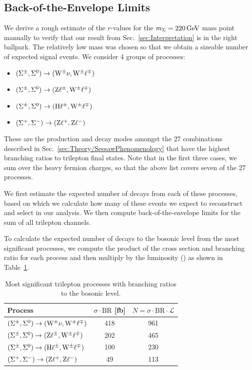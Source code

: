 \subsection{Back-of-the-Envelope Limits}
\label{sec:Results/BackOfEnvelope}
We derive a rough estimate of the $r$-values for the $m_\Sigma = 220\,\text{Ge\hspace{-.08em}V}$ mass point manually to verify that our result from Sec.~\ref{sec:Interpretation} is in the right ballpark. The relatively low mass was chosen so that we obtain a sizeable number of expected signal events. We consider 4 groups of processes:
\begin{itemize}
	\item $(\Sigma^\pm, \Sigma^0) \to (\mathrm{W}^\pm \nu, \mathrm{W}^\pm \ell^\mp)$
	\item $(\Sigma^\pm, \Sigma^0) \to (\mathrm{Z} \ell^\pm, \mathrm{W}^\pm \ell^\mp)$
	\item $(\Sigma^\pm, \Sigma^0) \to (\mathrm{H} \ell^\pm, \mathrm{W}^\pm \ell^\mp)$
	\item $(\Sigma^+, \Sigma^-) \to (\mathrm{Z} \ell^+, \mathrm{Z} \ell^-)$
\end{itemize}
These are the production and decay modes amongst the 27 combinations described in Sec.~\ref{sec:Theory/SeesawPhenomenology} that have the highest branching ratios to trilepton final states. Note that in the first three cases, we sum over the heavy fermion charges, so that the above list covers seven of the 27 processes.

We first estimate the expected number of decays from each of these processes, based on which we calculate how many of these events we expect to reconstruct and select in our analysis. We then compute back-of-the-envelope limits for the sum of all trilepton channels.

To calculate the expected number of decays to the bosonic level from the most significant processes, we compute the product of the cross section and branching ratio for each process and then multiply by the luminosity (\fullLumi) as shown in Table~\ref{tab:BackOfEnvelope/1}.

\begin{table}
\centering
\caption{Most significant trilepton processes with branching ratios to the bosonic level.} \label{tab:BackOfEnvelope/1}
\begin{tabular}{lcc}
\hline\hline
Process                                                       & $\sigma \cdot \textrm{BR}$ [fb] & $N = \sigma \cdot \textrm{BR} \cdot \mathcal{L}$ \\
\hline
$(\Sigma^\pm, \Sigma^0) \to (\mathrm{W}^\pm \nu, \mathrm{W}^\pm \ell^\mp)$  & 418                             & 961 \\
$(\Sigma^\pm, \Sigma^0) \to (\mathrm{Z} \ell^\pm, \mathrm{W}^\pm \ell^\mp)$  & 202                             & 465 \\
$(\Sigma^\pm, \Sigma^0) \to (\mathrm{H} \ell^\pm, \mathrm{W}^\pm \ell^\mp)$ & 100                             & 230 \\
$(\Sigma^+, \Sigma^-) \to (\mathrm{Z} \ell^+, \mathrm{Z} \ell^-)$             & 49                              & 113 \\
\end{tabular}
\end{table}

